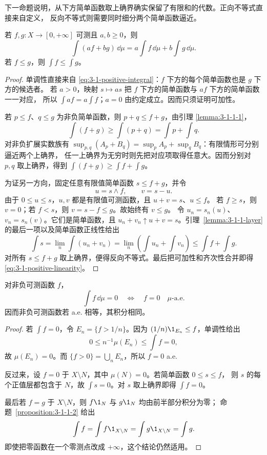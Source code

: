下一命题说明，从下方简单函数取上确界确实保留了有限和的代数。正向不等式直接来自定义，
反向不等式则需要同时细分两个简单函数逼近。

\begin{proposition}[非负积分的代数性质]\label{proposition:3-1-1-2}
若 $f,g:X\to[0,+\infty]$ 可测且 $a,b\geq0$，则
\[
 \int(af+bg)\,\dd\mu
 =a\int f\,\dd\mu+b\int g\,\dd\mu.
 \tag{3.1.5}\label{eq:3-1-positive-linearity}
\]
若 $f\leq g$，则 $\int f\leq\int g$。
\end{proposition}

\begin{proof}
单调性直接来自 \eqref{eq:3-1-positive-integral}：$f$ 下方的每个简单函数也是 $g$ 下方的候选者。
若 $a>0$，映射 $s\mapsto as$ 把 $f$ 下方的简单函数与 $af$ 下方的简单函数一一对应，
所以 $\int af=a\int f$；$a=0$ 由约定成立。因而只须证明可加性。

若 $p\leq f$、$q\leq g$ 为非负简单函数，则 $p+q\leq f+g$，由引理
\ref{lemma:3-1-1-1}，
\[
 \int(f+g)\geq\int(p+q)=\int p+\int q.
\]
对非负扩展实数族有
$\sup_{p,q}(A_p+B_q)=\sup_pA_p+\sup_qB_q$：有限情形可分别逼近两个上确界，
任一上确界为无穷时则先把对应项取得任意大。因而分别对 $p,q$ 取上确界，得到
$\int(f+g)\geq\int f+\int g$。

为证另一方向，固定任意有限值简单函数 $s\leq f+g$，并令
\[
 u=s\wedge f,
 \qquad v=s-u.
\]
由于 $0\leq u\leq s$，$u,v$ 都是有限值可测函数，且 $u+v=s$、$u\leq f$。
若 $f\geq s$，则 $v=0$；若 $f<s$，则 $v=s-f\leq g$。故始终有 $v\leq g$。
令 $u_n=s_n(u)$、$v_n=s_n(v)$。它们是简单函数，且
$u_n+v_n\uparrow u+v=s$。引理~\ref{lemma:3-1-1-layer} 的最后一项以及简单函数正线性给出
\[
 \int s
 =\lim_n\int(u_n+v_n)
 =\lim_n\left(\int u_n+\int v_n\right)
 \leq\int f+\int g.
\]
对所有 $s\leq f+g$ 取上确界，便得反向不等式。最后把可加性和齐次性合并即得
\eqref{eq:3-1-positive-linearity}。
\end{proof}

\begin{proposition}[零积分判据]\label{proposition:3-1-1-3}
对非负可测函数 $f$，
\[
 \int f\,\dd\mu=0
 \quad\Longleftrightarrow\quad
 f=0\quad\mu\text{-a.e.}
 \tag{3.1.6}\label{eq:3-1-zero-integral}
\]
因而非负可测函数若 a.e. 相等，其积分相同。
\end{proposition}

\begin{proof}
若 $\int f=0$，令 $E_n=\{f>1/n\}$。因为
$(1/n)\1_{E_n}\leq f$，单调性给出
\[
 0\leq n^{-1}\mu(E_n)\leq\int f=0,
\]
故 $\mu(E_n)=0$。而 $\{f>0\}=\bigcup_nE_n$，所以 $f=0$ a.e.

反过来，设 $f=0$ 于 $X\setminus N$，其中 $\mu(N)=0$。若简单函数 $0\leq s\leq f$，
则 $s$ 的每个正值层都包含于 $N$，故 $\int s=0$。对 $s$ 取上确界即得 $\int f=0$。

最后若 $f=g$ 于 $X\setminus N$，则 $f\1_N$ 与 $g\1_N$ 均由前半部分积分为零；
命题~\ref{proposition:3-1-1-2} 给出
\[
 \int f=\int f\1_{X\setminus N}=\int g\1_{X\setminus N}=\int g.
\]
即使把零函数在一个零测点改成 $+\infty$，这个结论仍然适用。
\end{proof}


